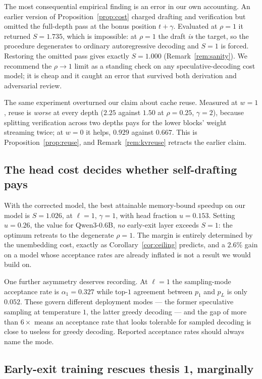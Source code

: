 The most consequential empirical finding is an error in our own accounting. An
earlier version of Proposition~\ref{prop:cost} charged drafting and verification
but omitted the full-depth pass at the bonus position $t+\gamma$. Evaluated at
$\rho = 1$ it returned $S = 1.735$, which is impossible: at $\rho=1$ the draft
\emph{is} the target, so the procedure degenerates to ordinary autoregressive
decoding and $S = 1$ is forced. Restoring the omitted pass gives exactly
$S = 1.000$ (Remark~\ref{rem:sanity}). We recommend the $\rho\to1$ limit as a
standing check on any speculative-decoding cost model; it is cheap and it caught
an error that survived both derivation and adversarial review.

The same experiment overturned our claim about cache reuse. Measured at $w=1$,
reuse is \emph{worse} at every depth ($2.25$ against $1.50$ at $\rho=0.25$,
$\gamma=2$), because splitting verification across two depths pays for the lower
blocks' weight streaming twice; at $w=0$ it helps, $0.929$ against $0.667$. This
is Proposition~\ref{prop:reuse}, and Remark~\ref{rem:kvreuse} retracts the
earlier claim.

\subsection{The head cost decides whether self-drafting pays}

With the corrected model, the best attainable memory-bound speedup on our model
is $S = 1.026$, at $\ell=1$, $\gamma=1$, with head fraction $u = 0.153$. Setting
$u = 0.26$, the value for Qwen3-0.6B, \emph{no} early-exit layer exceeds $S=1$:
the optimum retreats to the degenerate $\rho=1$. The margin is entirely
determined by the unembedding cost, exactly as Corollary~\ref{cor:ceiling}
predicts, and a $2.6\%$ gain on a model whose acceptance rates are already
inflated is not a result we would build on.

One further asymmetry deserves recording. At $\ell=1$ the sampling-mode
acceptance rate is $\alpha_1 = 0.327$ while top-$1$ agreement between $p_1$ and
$p_L$ is only $0.052$. These govern different deployment modes --- the former
speculative sampling at temperature $1$, the latter greedy decoding --- and the
gap of more than $6\times$ means an acceptance rate that looks tolerable for
sampled decoding is close to useless for greedy decoding. Reported acceptance
rates should always name the mode.

\subsection{Early-exit training rescues thesis 1, marginally}
\label{sec:exp-eetrain}

